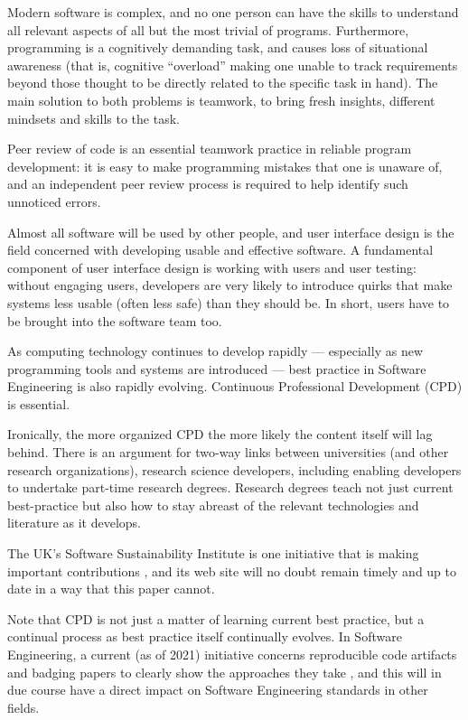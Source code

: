 \documentclass[10pt,a4paper]{article}
\begin{document}
Modern software is complex, and no one person can have the skills to understand all relevant aspects of all but the most trivial of programs. Furthermore, programming is a cognitively demanding task, and causes loss of situational awareness (that is, cognitive ``overload'' making one unable to track requirements beyond those thought to be directly related to the specific task in hand). The main solution to both problems is teamwork, to bring fresh insights, different mindsets and skills to the task.
 
Peer review of code is an essential teamwork practice in reliable program development: \cite{peerReview,knight} it is easy to make programming mistakes that one is unaware of, and an independent peer review process is required to help identify such unnoticed errors. 

Almost all software will be used by other people, and user interface design is the field concerned with developing usable and effective software. A fundamental component of user interface design is working with users and user testing: without engaging users, developers are very likely to introduce quirks that make systems less usable (often less safe) than they should be. In short, users have to be brought into the software team too.


As computing technology continues to develop rapidly --- especially as new programming tools and systems are introduced --- best practice in Software Engineering is also rapidly evolving. Continuous Professional Development (CPD) is essential. 

Ironically, the more organized CPD the more likely the content itself will lag behind. There is an argument for two-way links between universities (and other research organizations), research science developers, including enabling developers to undertake part-time research degrees. Research degrees teach not just current best-practice but also how to stay abreast of the relevant technologies and literature as it develops.

The UK's Software Sustainability Institute is one initiative that is making important contributions \cite{ssi-report,ssi-url}, and its web site will no doubt remain timely and up to date in a way that this paper cannot.

Note that CPD is not just a matter of learning current best practice, but a continual process as best practice itself continually evolves. {In Software Engineering, a current (as of 2021) initiative concerns reproducible code artifacts and badging papers to clearly show the approaches they take \cite{acm-artifacts}, and this will in due course have a direct impact on Software Engineering standards in other fields.}
\end{document}
